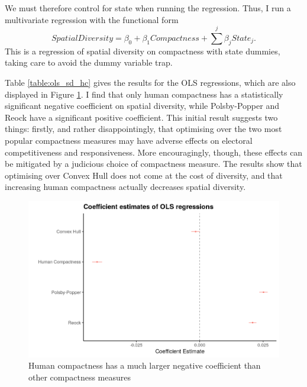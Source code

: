 \documentclass[]{article}
\begin{document}
We must therefore control for state when running the regression. Thus, I
run a multivariate regression with the functional form
\[SpatialDiversity = \beta_0 +
\beta_1 Compactness + \sum^j \beta_j State_j.\] This is a regression of
spatial diversity on compactness with state dummies, taking care to
avoid the dummy variable trap.

Table \ref{table:ols_sd_hc} gives the results for the OLS regressions,
which are also displayed in Figure \ref{regression_coefficients}. I find
that only human compactness has a statistically significant negative
coefficient on spatial diversity, while Polsby-Popper and Reock have a
significant positive coefficient. This initial result suggests two
things: firstly, and rather disappointingly, that optimising over the
two most popular compactness measures may have adverse effects on
electoral competitiveness and responsiveness. More encouragingly,
though, these effects can be mitigated by a judicious choice of
compactness measure. The results show that optimising over Convex Hull
does not come at the cost of diversity, and that increasing human
compactness actually decreases spatial diversity.

\begin{figure}
\centering
\includegraphics{../30_results/regression_coefficients.png}
\caption{Human compactness has a much larger negative coefficient than
other compactness measures \label{regression_coefficients}}
\end{figure}
\end{document}
